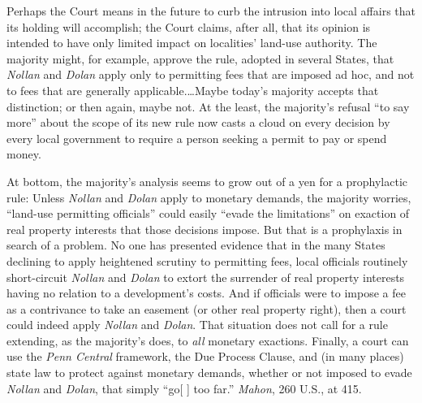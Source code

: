 Perhaps the Court means in the future to curb the intrusion into local affairs
that its holding will accomplish; the Court claims, after all, that its opinion
is intended to have only limited impact on localities' land-use authority. The
majority might, for example, approve the rule, adopted in several States, that
\textit{Nollan} and \textit{Dolan} apply only to permitting fees that are
imposed ad hoc, and not to fees that are generally applicable.\ldots Maybe
today's majority accepts that distinction; or then again, maybe not. At the
least, the majority's refusal ``to say more'' about the scope of its new rule
now casts a cloud on every decision by every local government to require a
person seeking a permit to pay or spend money. 

At bottom, the majority's analysis seems to grow out of a yen for a prophylactic
rule: Unless \textit{Nollan} and \textit{Dolan} apply to monetary demands, the
majority worries, ``land-use permitting officials'' could easily ``evade the
limitations'' on exaction of real property interests that those decisions
impose. But that is a prophylaxis in search of a problem. No one has presented
evidence that in the many States declining to apply heightened scrutiny to
permitting fees, local officials routinely short-circuit \textit{Nollan} and
\textit{Dolan} to extort the surrender of real property interests having no
relation to a development's costs. And if officials were to impose a fee as a
contrivance to take an easement (or other real property right), then a court
could indeed apply \textit{Nollan} and \textit{Dolan}. That situation does not
call for a rule extending, as the majority's does, to \textit{all} monetary
exactions. Finally, a court can use the \textit{Penn Central} framework, the Due
Process Clause, and (in many places) state law to protect against monetary
demands, whether or not imposed to evade \textit{Nollan} and \textit{Dolan},
that simply ``go[ ] too far.'' \textit{Mahon}, 260 U.S., at
415.

